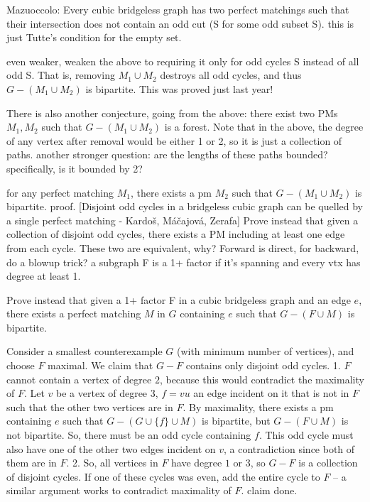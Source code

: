 Mazuoccolo: Every cubic bridgeless graph has two perfect matchings such that their intersection does not contain an odd cut (\partial S for some odd subset S).
this is just Tutte's condition for the empty set.

even weaker, weaken the above to requiring it only for odd cycles S instead of all odd S. That is, removing $M_1 \cup M_2$ destroys all odd cycles, and thus $G - (M_1 \cup M_2)$ is bipartite.
This was proved just last year!

There is also another conjecture, going from the above: there exist two PMs $M_1,M_2$ such that $G-(M_1 \cup M_2)$ is a forest.
Note that in the above, the degree of any vertex after removal would be either 1 or 2, so it is just a collection of paths. another stronger question: are the lengths of these paths bounded? specifically, is it bounded by 2?



for any perfect matching $M_1$, there exists a pm $M_2$ such that $G - (M_1 \cup M_2)$ is bipartite.
proof. [Disjoint odd cycles in a bridgeless cubic graph can be quelled by a single perfect matching - Kardoš, Máčajová, Zerafa]
Prove instead that given a collection of disjoint odd cycles, there exists a PM including at least one edge from each cycle. These two are equivalent, why? Forward is direct, for backward, do a blowup trick?
a subgraph F is a 1+ factor if it's spanning and every vtx has degree at least 1.

Prove instead that given a 1+ factor F in a cubic bridgeless graph and an edge $e$, there exists a perfect matching $M$ in $G$ containing $e$ such that $G-(F \cup M)$ is bipartite.

Consider a smallest counterexample $G$ (with minimum number of vertices), and choose $F$ maximal. We claim that $G-F$ contains only disjoint odd cycles.
1. $F$ cannot contain a vertex of degree $2$, because this would contradict the maximality of $F$. Let $v$ be a vertex of degree $3$, $f = vu$ an edge incident on it that is not in $F$ such that the other two vertices are in $F$. By maximality, there exists a pm containing $e$ such that $G - (G \cup \{f\} \cup M)$ is bipartite, but $G-(F \cup M)$ is not bipartite. So, there must be an odd cycle containing $f$. This odd cycle must also have one of the other two edges incident on $v$, a contradiction since both of them are in $F$. 
2. So, all vertices in $F$ have degree $1$ or $3$, so $G-F$ is a collection of disjoint cycles. If one of these cycles was even, add the entire cycle to $F$ -- a similar argument works to contradict maximality of $F$. claim done.

